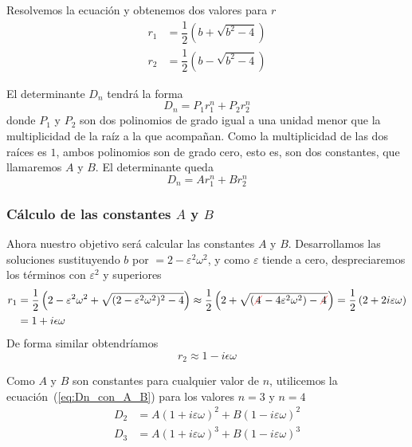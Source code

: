 Resolvemos la ecuación y obtenemos dos valores para $r$
\begin{align*}
  r_1 &= \dfrac{1}{2}\left(b+\sqrt{b^2-4}\right)\\
  r_2 &= \dfrac{1}{2}\left(b-\sqrt{b^2-4}\right)
\end{align*}

El determinante $D_n$ tendrá la forma
\[
  D_n = P_1 r_1^n + P_2 r_2^n
\]
donde $P_1$ y $P_2$ son dos polinomios de grado igual a una unidad
menor que la multiplicidad de la raíz a la que acompañan. Como la
multiplicidad de las dos raíces es $1$, ambos polinomios son de grado
cero, esto es, son dos constantes, que llamaremos $A$ y $B$. El
determinante queda
\begin{equation}\label{eq:Dn_con_A_B}
  D_n
  =
  A r_1^n + B r_2^n
\end{equation}

\subsubsection{Cálculo de las constantes $A$ y $B$}
Ahora nuestro objetivo será calcular las constantes $A$ y $B$.
Desarrollamos las soluciones sustituyendo $b$ por $=2-\varepsilon^2\omega^2$, y
como $\varepsilon$ tiende a cero, despreciaremos los términos con
$\varepsilon^2$ y superiores
\begin{align*}
  r_1
  &=
  \dfrac{1}{2}\left(
    2-\varepsilon^2\omega^2 + \sqrt{(2-\varepsilon^2\omega^2)^2-4}
    \right)
    \approx
    \dfrac{1}{2}\left(
    2
    + \sqrt{(\cancelout{4}-4\varepsilon^2\omega^2)-\cancelout{4}}
    \right)
  =
    \dfrac{1}{2}\left(
    2 + 2i\varepsilon\omega
    \right)\\
  &= 1+i\epsilon\omega
\end{align*}
De forma similar obtendríamos
\[
  r_2 \approx 1 - i\epsilon\omega
\]

Como $A$ y $B$ son constantes para cualquier valor de $n$, utilicemos
la ecuación~(\ref{eq:Dn_con_A_B}) para los valores $n=3$ y $n=4$
\begin{align*}
  D_2 &= A (1+i\varepsilon\omega)^2 + B(1-i\varepsilon\omega)^2\\
  D_3 &= A (1+i\varepsilon\omega)^3 + B(1-i\varepsilon\omega)^3
\end{align*}

